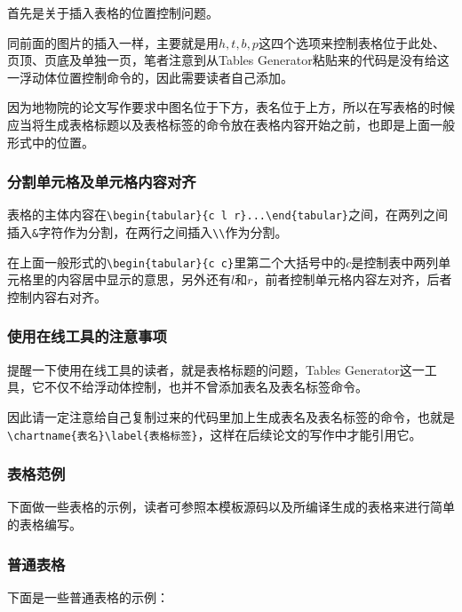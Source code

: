 首先是关于插入表格的位置控制问题。

同前面的图片的插入一样，主要就是用$h,t,b,p$这四个选项来控制表格位于此处、页顶、页底及单独一页，笔者注意到从Tables Generator粘贴来的代码是没有给这一浮动体位置控制命令的，因此需要读者自己添加。

因为地物院的论文写作要求中图名位于下方，表名位于上方，所以在写表格的时候应当将生成表格标题以及表格标签的命令放在表格内容开始之前，也即是上面一般形式中的位置。

\subsubsection{分割单元格及单元格内容对齐}

表格的主体内容在\verb|\begin{tabular}{c l r}...\end{tabular}|之间，在两列之间插入\verb|&|字符作为分割，在两行之间插入\verb|\\|作为分割。
\par
在上面一般形式的\verb|\begin{tabular}{c c}|里第二个大括号中的$c$是控制表中两列单元格里的内容居中显示的意思，另外还有$l$和$r$，前者控制单元格内容左对齐，后者控制内容右对齐。

\subsubsection{使用在线工具的注意事项}

提醒一下使用在线工具的读者，就是表格标题的问题，Tables Generator这一工具，它不仅不给浮动体控制，也并不曾添加表名及表名标签命令。\par 因此请一定注意给自己复制过来的代码里加上生成表名及表名标签的命令，也就是\verb|\chartname{表名}\label{表格标签}|，这样在后续论文的写作中才能引用它。

\subsubsection{表格范例}

下面做一些表格的示例，读者可参照本模板源码以及所编译生成的表格来进行简单的表格编写。

\subsubsection{普通表格}

下面是一些普通表格的示例：

